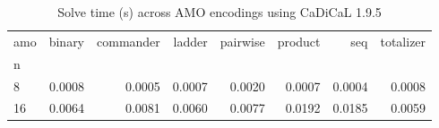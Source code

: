 \begin{table}
\caption{Solve time (s) across AMO encodings using CaDiCaL 1.9.5}
\begin{tabular}{lrrrrrrr}
\toprule
amo & binary & commander & ladder & pairwise & product & seq & totalizer \\
n &  &  &  &  &  &  &  \\
\midrule
8 & 0.0008 & 0.0005 & 0.0007 & 0.0020 & 0.0007 & 0.0004 & 0.0008 \\
16 & 0.0064 & 0.0081 & 0.0060 & 0.0077 & 0.0192 & 0.0185 & 0.0059 \\
\bottomrule
\end{tabular}
\end{table}
